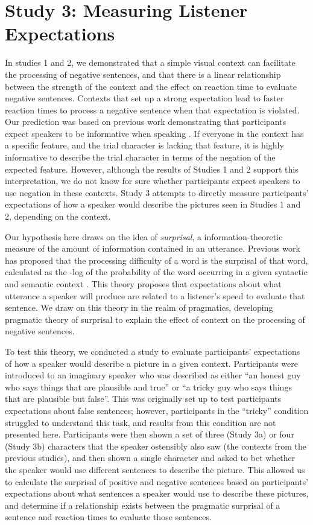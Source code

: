 \documentclass[10pt,letterpaper]{article}
\begin{document}
\section{Study 3: Measuring Listener Expectations}
In studies 1 and 2, we demonstrated that a simple visual context can facilitate the processing of negative sentences, and that there is a linear relationship between the strength of the context and the effect on reaction time to evaluate negative sentences.  Contexts that set up a strong expectation lead to faster reaction times to process a negative sentence when that expectation is violated.  Our prediction was based on previous work demonstrating that participants expect speakers to be informative when speaking \cite{frank2012}.  If everyone in the context has a specific feature, and the trial character is lacking that feature, it is highly informative to describe the trial character in terms of the negation of the expected feature.  However, although the results of Studies 1 and 2 support this interpretation, we do not know for sure whether participants expect speakers to use negation in these contexts.  Study 3 attempts to directly measure participants' expectations of how a speaker would describe the pictures seen in Studies 1 and 2, depending on the context.

Our hypothesis here draws on the idea of \emph{surprisal}, a information-theoretic measure of the amount of information contained in an utterance.  Previous work has proposed that the processing difficulty of a word is the surprisal of that word, calculated as the -log of the probability of the word occurring in a given syntactic and semantic context \cite{levy2008}.  This theory proposes that expectations about what utterance a speaker will produce are related to a listener's speed to evaluate that sentence.  We draw on this theory in the realm of pragmatics, developing pragmatic theory of surprisal to explain the effect of context on the processing of negative sentences.  

To test this theory, we conducted a study to evaluate participants' expectations of how a speaker would describe a picture in a given context.  Participants were introduced to an imaginary speaker who was described as either ``an honest guy who says things that are plausible and true'' or ``a tricky guy who says things that are plausible but false''.  This was originally set up to test participants expectations about false sentences; however, participants in the ``tricky'' condition struggled to understand this task, and results from this condition are not presented here.  Participants were then shown a set of three (Study 3a) or four (Study 3b) characters that the speaker ostensibly also saw (the contexts from the previous studies), and then shown a single character and asked to bet whether the speaker would use different sentences to describe the picture.  This allowed us to calculate the surprisal of positive and negative sentences based on participants' expectations about what sentences a speaker would use to describe these pictures, and determine if a relationship exists between the pragmatic surprisal of a sentence and reaction times to evaluate those sentences.  
\end{document}
